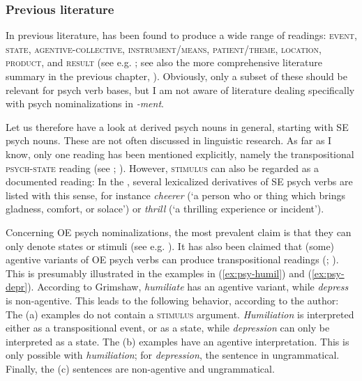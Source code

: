 \subsubsection{Previous literature}
\label{sec:psy-output-lit}

In previous literature, \ment{} has been found to produce a wide range of readings: \textsc{event}, \textsc{state}, \textsc{agentive-collective}, \textsc{instrument/means}, \mbox{\textsc{patient/theme}}, \textsc{location}, \textsc{product}, and \textsc{result} (see e.g. \citealt{Gadde.1910,Marchand.1969,Bauer.2013,Lieber.2016}; see also the more comprehensive literature summary in the previous chapter, ). Obviously, only a subset of these should be relevant for psych verb bases, but I am not aware of literature dealing specifically with psych nominalizations in \textit{-ment}.

Let us therefore have a look at derived psych nouns in general, starting with SE psych nouns. These are not often discussed in linguistic research. As far as I know, only one reading has been mentioned explicitly, namely the transpositional \textsc{psych-state} reading (see \citealt[119]{Grimshaw.1990}; \citealt[659]{VanValinJr.1997}). However, \textsc{stimulus} can also be regarded as a documented reading: In the , several lexicalized derivatives of SE psych verbs are listed with this sense, for instance \textit{cheerer} (`a person who or thing which brings gladness, comfort, or solace') or \textit{thrill} (`a thrilling experience or incident').

Concerning OE psych nominalizations, the most prevalent claim is that they can only denote states or stimuli (see e.g. \citealt[72]{Pesetsky.1995}).
It has also been claimed that (some) agentive variants of OE psych verbs can produce transpositional readings (\citealt[119]{Grimshaw.1990}; \citealt{Iordachioaia.2020}). This is presumably illustrated in the examples in (\ref{ex:psy-humil}) and (\ref{ex:psy-depr}). According to Grimshaw, \textit{humiliate} has an agentive variant, while \textit{depress} is non-agentive. This leads to the following behavior, according to the author:
The (a) examples do not contain a \textsc{stimulus} argument. \textit{Humiliation} is interpreted either as a transpositional event, or as a state, while \textit{depression} can only be interpreted as a state.
The (b) examples have an agentive interpretation. This is only possible with \textit{humiliation}; for \textit{depression}, the sentence in ungrammatical.
Finally, the (c) sentences are non-agentive and ungrammatical.

